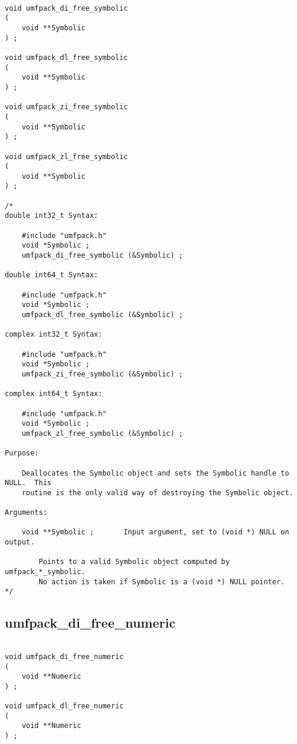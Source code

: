 \documentclass[11pt]{article}
\begin{document}
{\footnotesize
\begin{verbatim}

void umfpack_di_free_symbolic
(
    void **Symbolic
) ;

void umfpack_dl_free_symbolic
(
    void **Symbolic
) ;

void umfpack_zi_free_symbolic
(
    void **Symbolic
) ;

void umfpack_zl_free_symbolic
(
    void **Symbolic
) ;

/*
double int32_t Syntax:

    #include "umfpack.h"
    void *Symbolic ;
    umfpack_di_free_symbolic (&Symbolic) ;

double int64_t Syntax:

    #include "umfpack.h"
    void *Symbolic ;
    umfpack_dl_free_symbolic (&Symbolic) ;

complex int32_t Syntax:

    #include "umfpack.h"
    void *Symbolic ;
    umfpack_zi_free_symbolic (&Symbolic) ;

complex int64_t Syntax:

    #include "umfpack.h"
    void *Symbolic ;
    umfpack_zl_free_symbolic (&Symbolic) ;

Purpose:

    Deallocates the Symbolic object and sets the Symbolic handle to NULL.  This
    routine is the only valid way of destroying the Symbolic object.

Arguments:

    void **Symbolic ;       Input argument, set to (void *) NULL on output.

        Points to a valid Symbolic object computed by umfpack_*_symbolic.
        No action is taken if Symbolic is a (void *) NULL pointer.
*/

\end{verbatim}

\subsection{umfpack\_di\_free\_numeric}

{\footnotesize
\begin{verbatim}

void umfpack_di_free_numeric
(
    void **Numeric
) ;

void umfpack_dl_free_numeric
(
    void **Numeric
) ;


\end{verbatim}}}
\end{document}
